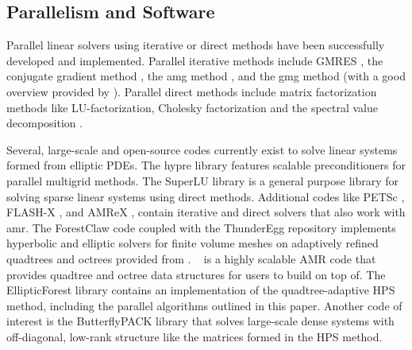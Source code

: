 \subsection{Parallelism and Software}

Parallel linear solvers using iterative or direct methods have been successfully developed and implemented. Parallel iterative methods include GMRES \citep{saad1986gmres}, the conjugate gradient method \citep{hestenes1952methods}, the \gls{amg} method \citep{yang2002boomeramg}, and the \gls{gmg} method \citep{sundar2012parallel} (with a good overview provided by \citet{chow2006survey}). Parallel direct methods include matrix factorization methods like LU-factorization, Cholesky factorization and the spectral value decomposition \citep{donfack2015survey, demmel1999asynchronous, gupta1997highly}.


Several, large-scale and open-source codes currently exist to solve linear systems formed from elliptic PDEs. The hypre library \citep{falgout2002hypre} features scalable preconditioners for parallel multigrid methods. The SuperLU library \citep{li2005superlu} is a general purpose library for solving sparse linear systems using direct methods. Additional codes like PETSc \citep{anl2023petsc}, FLASH-X \citep{dubey2022flash}, and AMReX \citep{zhang2019amrex}, contain iterative and direct solvers that also work with \gls{amr}. The ForestClaw code \citep{calhoun2017forestclaw} coupled with the ThunderEgg repository \citep{aiton2022thunderegg} implements hyperbolic and elliptic solvers for finite volume meshes on adaptively refined quadtrees and octrees provided from \pforest. \pforest\ \citep{burstedde2011p4est,burstedde2020parallel} is a highly scalable AMR code that provides quadtree and octree data structures for users to build on top of. The EllipticForest library \citep{chipman2024ellipticforest} contains an implementation of the quadtree-adaptive HPS method, including the parallel algorithms outlined in this paper. Another code of interest is the ButterflyPACK library \citep{liu2018butterflypack} that solves large-scale dense systems with off-diagonal, low-rank structure like the matrices formed in the HPS method.